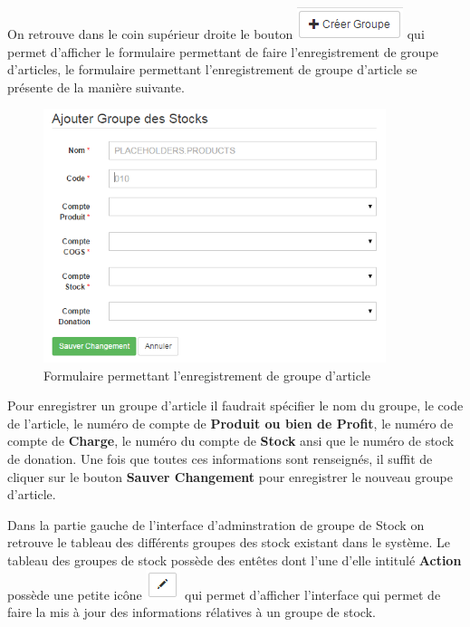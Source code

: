 \documentclass[12pt,a4paper]{report}
\begin{document}
On retrouve dans le coin supérieur droite le bouton \includegraphics[scale=0.7]{pic/CreerGroupeArticle.png} qui permet d'afficher le formulaire permettant de faire l'enregistrement de groupe d'articles, le formulaire permettant l'enregistrement de groupe d'article se présente de la manière suivante.

\begin{figure}[h]
\begin{center}
\includegraphics[width=10cm]{pic/AddGroupStock.png}
\end{center}
\caption{Formulaire permettant l'enregistrement de groupe d'article}
\label{Formulaire permettant l'enregistrement de groupe d'article}
\end{figure}

Pour enregistrer un groupe d'article il faudrait spécifier le nom du groupe, le code de l'article, le numéro de compte de \textbf{Produit ou bien de Profit}, le numéro de compte de \textbf{Charge}, le numéro du compte de \textbf{Stock} ansi que le numéro de stock de donation. Une fois que toutes ces informations sont renseignés, il suffit de cliquer sur le bouton \textbf{Sauver Changement} pour enregistrer le nouveau groupe d'article.

Dans la partie gauche de l'interface d'adminstration de groupe de Stock on retrouve le tableau des différents groupes des stock existant dans le système. Le tableau des groupes de stock possède des entêtes dont l'une d'elle intitulé \textbf{Action} possède une petite icône \includegraphics[scale=0.7]{pic/EditBlack.png} qui permet d'afficher l'interface qui permet de faire la mis à jour des informations rélatives à un groupe de stock. 
\end{document}
